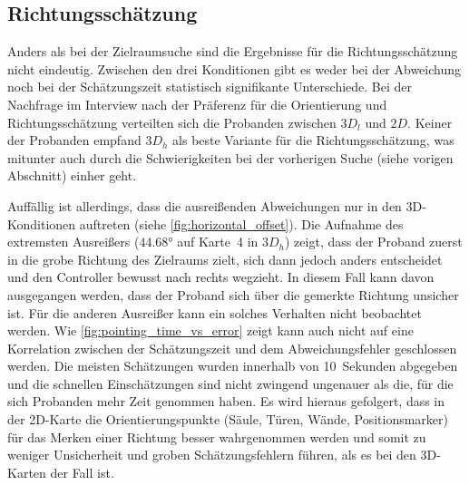 \subsection{Richtungsschätzung}
Anders als bei der Zielraumsuche sind die Ergebnisse für die Richtungsschätzung nicht eindeutig.
Zwischen den drei Konditionen gibt es weder bei der Abweichung noch bei der Schätzungszeit statistisch signifikante Unterschiede.
Bei der Nachfrage im Interview nach der Präferenz für die Orientierung und Richtungsschätzung verteilten sich die Probanden zwischen $3D_l$ und $2D$.
Keiner der Probanden empfand $3D_h$ als beste Variante für die Richtungsschätzung, was mitunter auch durch die Schwierigkeiten bei der vorherigen Suche (siehe vorigen Abschnitt) einher geht. 

Auffällig ist allerdings, dass die ausreißenden Abweichungen nur in den 3D-Konditionen auftreten (siehe \autoref{fig:horizontal_offset}).
Die Aufnahme des extremsten Ausreißers ($\ang{44,68}$ auf Karte~4 in $3D_h$) zeigt, dass der Proband zuerst in die grobe Richtung des Zielraums zielt, sich dann jedoch anders entscheidet und den Controller bewusst nach rechts wegzieht.
In diesem Fall kann davon ausgegangen werden, dass der Proband sich über die gemerkte Richtung unsicher ist.
Für die anderen Ausreißer kann ein solches Verhalten nicht beobachtet werden.
Wie \autoref{fig:pointing_time_vs_error} zeigt kann auch nicht auf eine Korrelation zwischen der Schätzungszeit und dem Abweichungsfehler geschlossen werden.
Die meisten Schätzungen wurden innerhalb von 10~Sekunden abgegeben und die schnellen Einschätzungen sind nicht zwingend ungenauer als die, für die sich Probanden mehr Zeit genommen haben.
Es wird hieraus gefolgert, dass in der 2D-Karte die Orientierungspunkte (Säule, Türen, Wände, Positionsmarker) für das Merken einer Richtung besser wahrgenommen werden und somit zu weniger Unsicherheit und groben Schätzungsfehlern führen, als es bei den 3D-Karten der Fall ist.

